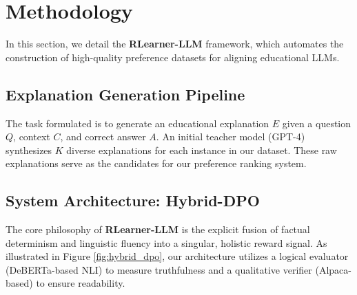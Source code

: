 \section{Methodology}

In this section, we detail the \textbf{RLearner-LLM} framework, which automates the construction of high-quality preference datasets for aligning educational LLMs.

\subsection{Explanation Generation Pipeline}
The task formulated is to generate an educational explanation $E$ given a question $Q$, context $C$, and correct answer $A$. An initial teacher model (GPT-4) synthesizes $K$ diverse explanations for each instance in our dataset. These raw explanations serve as the candidates for our preference ranking system.

\subsection{System Architecture: Hybrid-DPO}

The core philosophy of \textbf{RLearner-LLM} is the explicit fusion of factual determinism and linguistic fluency into a singular, holistic reward signal. As illustrated in Figure \ref{fig:hybrid_dpo}, our architecture utilizes a logical evaluator (DeBERTa-based NLI) to measure truthfulness and a qualitative verifier (Alpaca-based) to ensure readability.

